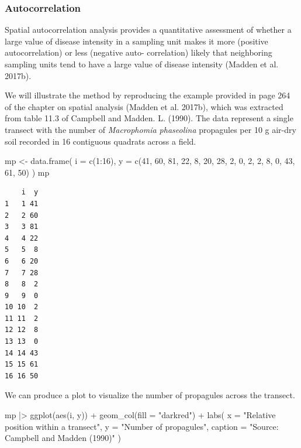 \documentclass[
  letterpaper,
  DIV=11,
  numbers=noendperiod]{scrreprt}
\newenvironment{Shaded}{\begin{snugshade}}{\end{snugshade}}
\newcommand{\AttributeTok}[1]{\textcolor[rgb]{0.40,0.45,0.13}{#1}}
\newcommand{\DecValTok}[1]{\textcolor[rgb]{0.68,0.00,0.00}{#1}}
\newcommand{\FunctionTok}[1]{\textcolor[rgb]{0.28,0.35,0.67}{#1}}
\newcommand{\NormalTok}[1]{\textcolor[rgb]{0.00,0.23,0.31}{#1}}
\newcommand{\OtherTok}[1]{\textcolor[rgb]{0.00,0.23,0.31}{#1}}
\newcommand{\SpecialCharTok}[1]{\textcolor[rgb]{0.37,0.37,0.37}{#1}}
\newcommand{\StringTok}[1]{\textcolor[rgb]{0.13,0.47,0.30}{#1}}
\begin{document}
\hypertarget{autocorrelation}{%
\subsubsection{Autocorrelation}\label{autocorrelation}}

Spatial autocorrelation analysis provides a quantitative assessment of
whether a large value of disease intensity in a sampling unit makes it
more (positive autocorrelation) or less (negative auto- correlation)
likely that neighboring sampling units tend to have a large value of
disease intensity (Madden et al. 2017b).

We will illustrate the method by reproducing the example provided in
page 264 of the chapter on spatial analysis (Madden et al. 2017b), which
was extracted from table 11.3 of Campbell and Madden. L. (1990). The
data represent a single transect with the number of \emph{Macrophomia
phaseolina} propagules per 10 g air-dry soil recorded in 16 contiguous
quadrats across a field.

\begin{Shaded}
\begin{Highlighting}[]
\NormalTok{mp }\OtherTok{\textless{}{-}} \FunctionTok{data.frame}\NormalTok{(}
  \AttributeTok{i =} \FunctionTok{c}\NormalTok{(}\DecValTok{1}\SpecialCharTok{:}\DecValTok{16}\NormalTok{),}
  \AttributeTok{y =} \FunctionTok{c}\NormalTok{(}\DecValTok{41}\NormalTok{, }\DecValTok{60}\NormalTok{, }\DecValTok{81}\NormalTok{, }\DecValTok{22}\NormalTok{, }\DecValTok{8}\NormalTok{, }\DecValTok{20}\NormalTok{, }\DecValTok{28}\NormalTok{, }\DecValTok{2}\NormalTok{, }\DecValTok{0}\NormalTok{, }\DecValTok{2}\NormalTok{, }\DecValTok{2}\NormalTok{, }\DecValTok{8}\NormalTok{, }\DecValTok{0}\NormalTok{, }\DecValTok{43}\NormalTok{, }\DecValTok{61}\NormalTok{, }\DecValTok{50}\NormalTok{)}
\NormalTok{)}
\NormalTok{mp}
\end{Highlighting}
\end{Shaded}

\begin{verbatim}
    i  y
1   1 41
2   2 60
3   3 81
4   4 22
5   5  8
6   6 20
7   7 28
8   8  2
9   9  0
10 10  2
11 11  2
12 12  8
13 13  0
14 14 43
15 15 61
16 16 50
\end{verbatim}

We can produce a plot to visualize the number of propagules across the
transect.

\begin{Shaded}
\begin{Highlighting}[]
\NormalTok{mp }\SpecialCharTok{|\textgreater{}}
  \FunctionTok{ggplot}\NormalTok{(}\FunctionTok{aes}\NormalTok{(i, y)) }\SpecialCharTok{+}
  \FunctionTok{geom\_col}\NormalTok{(}\AttributeTok{fill =} \StringTok{"darkred"}\NormalTok{) }\SpecialCharTok{+}
  \FunctionTok{labs}\NormalTok{(}
    \AttributeTok{x =} \StringTok{"Relative position within a transect"}\NormalTok{,}
    \AttributeTok{y =} \StringTok{"Number of propagules"}\NormalTok{,}
    \AttributeTok{caption =} \StringTok{"Source: Campbell and Madden (1990)"}
\NormalTok{  )}
\end{Highlighting}
\end{Shaded}
\end{document}
